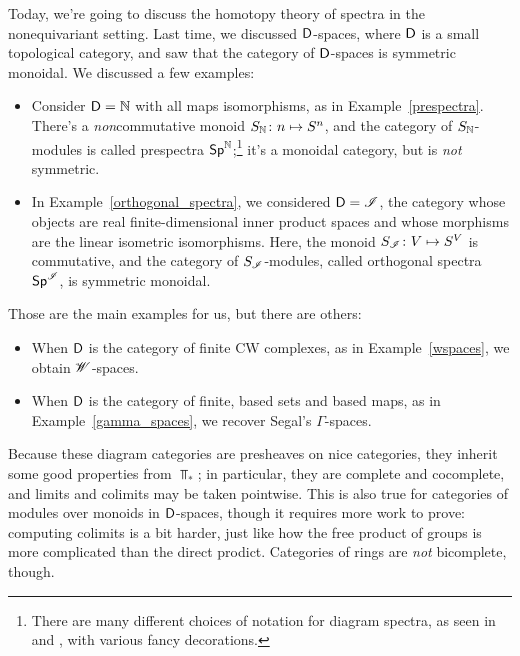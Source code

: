 Today, we're going to discuss the homotopy theory of spectra in the nonequivariant setting. Last time, we discussed
$\mathsf D$-spaces, where $\mathsf D$ is a small topological category, and saw that the category of $\mathsf D$-spaces is symmetric
monoidal. We discussed a few examples:
\begin{itemize}
	\item Consider $\mathsf D = \mathbb N$ with all maps isomorphisms, as in Example~\ref{prespectra}. There's a
	\emph{non}commutative monoid $S_\N\colon n\mapsto S^n$, and the category of $S_\mathbb N$-modules is called prespectra
	$\mathsf{Sp}^\mathbb N$;\footnote{There are many different choices of notation for diagram spectra, as seen in~\cite{MMSS}
	and \cite{MandellMay}, with various fancy decorations.} it's a monoidal category, but is \emph{not} symmetric.
	\item In Example~\ref{orthogonal_spectra}, we considered $\mathsf D = \mathscr I$, the category whose objects are real
	finite-dimensional inner product spaces and whose morphisms are the linear isometric isomorphisms. Here, the
	monoid $S_\sI\colon V\mapsto S^V$ is commutative, and the category of $S_\mathscr I$-modules, called orthogonal
	spectra $\mathsf{Sp}^\mathscr I$, is symmetric monoidal.
\end{itemize}
Those are the main examples for us, but there are others:
\begin{itemize}
	\item When $\mathsf D$ is the category of finite CW complexes, as in Example~\ref{wspaces}, we obtain $\mathscr W$-spaces.
	\item When $\mathsf D$ is the category of finite, based sets and based maps, as in Example~\ref{gamma_spaces}, we
	recover Segal's $\Gamma$-spaces.
\end{itemize}
Because these diagram categories are presheaves on nice categories, they inherit some good properties from $\Top_*$;
in particular, they are complete and cocomplete, and limits and colimits may be taken pointwise. This is also true
for categories of modules over monoids in $\mathsf D$-spaces, though it requires more work to prove: computing colimits
is a bit harder, just like how the free product of groups is more complicated than the direct prodict. Categories
of rings are \emph{not} bicomplete, though.

